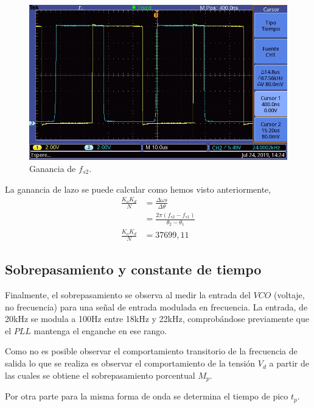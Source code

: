 \documentclass[twocolumn]{article}
\begin{document}
\begin{figure}[H]
  \centering    
  \includegraphics[width=\columnwidth]{imagenes/osc2.jpg}
  \caption{Ganancia de $f_{s2}$.}\label{fig:osc2}
\end{figure}

La ganancia de lazo se puede calcular como hemos visto anteriormente,
\begin{align*}
	\frac{K_o K_d}{N}  &= \frac{\Delta \omega s}{\Delta \theta} \\
					   &= \frac{2 \pi (f_{s2} - f_{s1})} {\theta_2 - \theta_1} \\
	\frac{K_o K_d}{N}  &= 37699,11
\end{align*}

\subsection{Sobrepasamiento y constante de tiempo}
Finalmente, el sobrepasamiento se observa al medir la entrada del $VCO$ (voltaje, no frecuencia) para una señal de entrada modulada en frecuencia. La entrada, de 20kHz se modula a 100Hz entre 18kHz y 22kHz, comprobándose previamente que el $PLL$ mantenga el enganche en ese rango.

Como no es posible observar el comportamiento transitorio de la frecuencia de salida lo que se realiza es observar el comportamiento de la tensión $V_d$ a partir de las cuales se obtiene el sobrepasamiento porcentual $M_{p}$.

Por otra parte para la misma forma de onda se determina el tiempo de pico $t_p$. 
\end{document}
